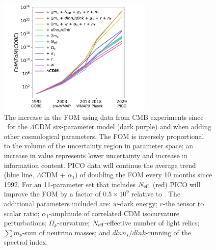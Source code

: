 \documentclass[PICOReport.tex]{subfiles}
\begin{document}
 \begin{figure}%
\hspace{-0.2in}
\parbox{2.7in}{\centerline {
\includegraphics[width=3.0in]{images/fom_plot_PICO.pdf} } }
\hspace{0.in}
\parbox{3.8in}{
\caption{\captiontext 
The increase in the FOM using data from CMB experiments since \cobe\ for the $\Lambda$CDM six-parameter model (dark purple) and when adding other cosmological parameters.  The FOM is inversely proportional to the volume of the uncertainty region in parameter space; an increase in value represents lower uncertainty and increase in information content. PICO data will continue the average trend (blue line, $\Lambda$CDM + $\alpha_{1}$) of doubling the FOM every 10 months since 1992. For an 11-parameter set that includes ${N_{\rm eff}}$ (red) PICO will improve the FOM by a factor of $0.5\times10^{9}$ relative to \planck . The additional parameters included are: $w$-dark energy; $r$-the tensor to scalar ratio; $\alpha_{1}$-amplitude of correlated CDM isocurvature perturbations; $\Omega_{k}$-curvature; ${N_{\rm eff}}$-effective number of light relics; $\sum m_{\nu}$-sum of neutrino masses; and $dlnn_{s}/dlnk$-running of the spectral index.   
\label{fig:fom} } }
\vspace{-0.13in}
\end{figure}
\end{document}
